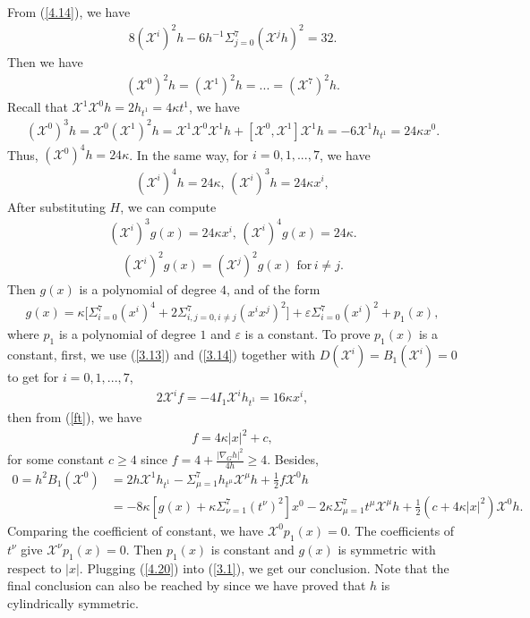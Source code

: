 \documentclass[reqno,12pt]{amsart}
\numberwithin{equation}{section}
\theoremstyle{plain}
\theoremstyle{definition}
\begin{document}
From (\ref{4.14}), we have
\begin{align}
    8(\mathscr{X}^i)^2h-6h^{-1}\Sigma_{j=0}^7(\mathscr{X}^j h)^2     =32.
\end{align}
Then we have
\begin{align}
    (\mathscr{X}^0)^2 h=(\mathscr{X}^1)^2 h=...=(\mathscr{X}^7)^2 h.
\end{align}
Recall that $\mathscr{X}^1\mathscr{X}^0 h=2h_{t^1}=4\kappa t^1$, we have
\begin{align}
   ( \mathscr{X}^0)^3h=\mathscr{X}^0 (\mathscr{X}^1)^2 h=\mathscr{X}^1\mathscr{X}^0\mathscr{X}^1 h+[\mathscr{X}^0,\mathscr{X}^1]\mathscr{X}^1 h=-6\mathscr{X}^1 h_{t^1}=24\kappa x^0.
\end{align}
Thus, $(\mathscr{X}^0)^4h=24\kappa$. In the same way, for $i=0,1,...,7$, we have
\begin{align}
    (\mathscr{X}^i)^4 h=24\kappa,\, (\mathscr{X}^i)^3h=24\kappa x^i,
\end{align}
After substituting $H$, we can compute 
\begin{align}
    (\mathscr{X}^i)^3g(x)=24\kappa x^i,\,(\mathscr{X}^i)^4g(x)=24\kappa.
\end{align}
\begin{align}
    (\mathscr{X}^i)^2g(x)=(\mathscr{X}^j)^2g(x)\,\,\textrm{for}\, i\neq j.
\end{align}
Then $g(x)$ is a polynomial of degree $4$, and of the form
\begin{align}\label{4.20}
    g(x)=\kappa \bigg[\Sigma_{i=0}^7(x^i)^4+2\Sigma_{i,j=0,i\neq j}^7 (x^i x^j)^2\bigg]+\varepsilon\Sigma_{i=0}^7(x^i)^2+p_1(x),
\end{align}
where $p_1$ is a polynomial of degree $1$ and $\varepsilon$ is a constant. To prove $p_1(x)$ is a constant, first, we use (\ref{3.13}) and (\ref{3.14}) together with $D(\mathscr{X}^i)=B_1(\mathscr{X}^i)=0$ to get for $i=0,1,...,7$,
\begin{align*}
    2\mathscr{X}^if=-4 I_{1}\mathscr{X}^ih_{t^1}=16\kappa x^i,
    \end{align*}
then from (\ref{ft}), we have
\begin{align*}
    f=4\kappa|x|^2+c,
\end{align*}
for some constant $c\geq 4$ since $f=4+\frac{|\nabla_G h|^2}{4h}\geq 4$. Besides,
\begin{align*}
    0=h^2B_1(\mathscr{X}^0)&=2h\mathscr{X}^1h_{t^1}-\Sigma_{\mu=1}^7h_{t^\mu}\mathscr{X}^\mu h+\frac{1}{2} f\mathscr{X}^0 h\\&=-8\kappa[g(x)+\kappa\Sigma_{\nu=1}^7 (t^\nu)^2]x^0-2\kappa \Sigma_{\mu=1}^7t^\mu \mathscr{X}^\mu h+\frac{1}{2}(c+4\kappa|x|^2)\mathscr{X}^0 h.
\end{align*}
Comparing the coefficient of constant, we have $\mathscr{X}^0p_1(x)=0$. The coefficients of $t^\nu$ give $\mathscr{X}^\nu p_1(x)=0$. Then $p_1(x)$ is constant and $g(x)$ is symmetric with respect to $|x|$. Plugging (\ref{4.20}) into (\ref{3.1}), we get our conclusion. Note that the final conclusion can also be reached by \cite{GV2001} since we have proved that $h$ is cylindrically symmetric. \\
\end{document}
